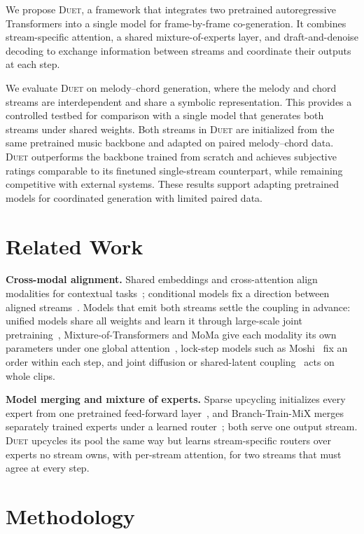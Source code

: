 \documentclass{article}
\newcommand{\sys}{\textsc{Duet}\xspace}
\begin{document}
We propose \sys, a framework that integrates two pretrained
autoregressive Transformers into a single model for frame-by-frame
co-generation. It combines stream-specific attention, a shared
mixture-of-experts layer, and draft-and-denoise decoding to exchange
information between streams and coordinate their outputs at each step.

We evaluate \sys on melody--chord generation, where the melody and
chord streams are interdependent and share a symbolic representation.
This provides a controlled testbed for comparison with a single model
that generates both streams under shared weights. Both streams in
\sys are initialized from the same pretrained music backbone and
adapted on paired melody--chord data. \sys outperforms the backbone
trained from scratch and achieves subjective ratings comparable to
its finetuned single-stream counterpart, while remaining competitive
with external systems. These results support adapting pretrained
models for coordinated generation with limited paired data.

\section{Related Work}
\label{sec:related}

\textbf{Cross-modal alignment.} Shared embeddings and cross-attention
align modalities for contextual tasks~\cite{clip,flamingo}; conditional
models fix a direction between aligned streams~\cite{yeh2021,sun2021,whole_song}.
Models that emit both streams settle the coupling in advance: unified
models share all weights and learn it through large-scale joint
pretraining~\cite{chameleon,transfusion,bagel}, Mixture-of-Transformers
and MoMa give each modality its own parameters under one global
attention~\cite{mot,moma}, lock-step models such as Moshi~\cite{moshi}
fix an order within each step, and joint diffusion or shared-latent
coupling~\cite{mmdiffusion,codi,seeing_hearing} acts on whole clips.

\textbf{Model merging and mixture of experts.} Sparse upcycling
initializes every expert from one pretrained feed-forward
layer~\cite{upcycling}, and Branch-Train-MiX merges separately trained
experts under a learned router~\cite{btx}; both serve one output stream.
\sys upcycles its pool the same way but learns stream-specific routers
over experts no stream owns, with per-stream attention, for two streams
that must agree at every step.

\section{Methodology}
\label{sec:method}
\end{document}
